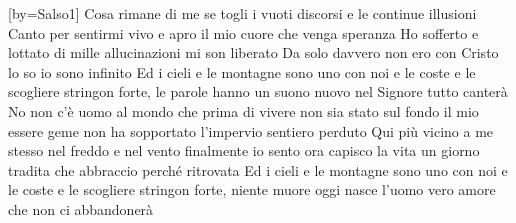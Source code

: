 [by={Salso1}]
\beginverse
Cosa rimane di me se togli i vuoti discorsi e le continue illusioni
Canto per sentirmi vivo e apro il mio cuore che venga speranza
Ho sofferto e lottato di mille allucinazioni mi son liberato
Da solo davvero non ero con Cristo lo so io sono infinito
\endverse
\beginchorus
Ed i cieli e le montagne sono uno con noi
e le coste e le scogliere stringon forte,
le parole hanno un suono nuovo
nel Signore tutto canterà
\endchorus
\beginverse
No non c'è uomo al mondo che prima di vivere
non sia stato sul fondo
il mio essere geme non ha sopportato
l'impervio sentiero perduto
Qui più vicino a me stesso nel freddo e nel vento
finalmente io sento
ora capisco la vita un giorno tradita
che abbraccio perché ritrovata
\endverse
\beginchorus
Ed i cieli e le montagne sono uno con noi
e le coste e le scogliere stringon forte,
niente muore oggi nasce l'uomo
vero amore che non ci abbandonerà
\endchorus
\endsong
